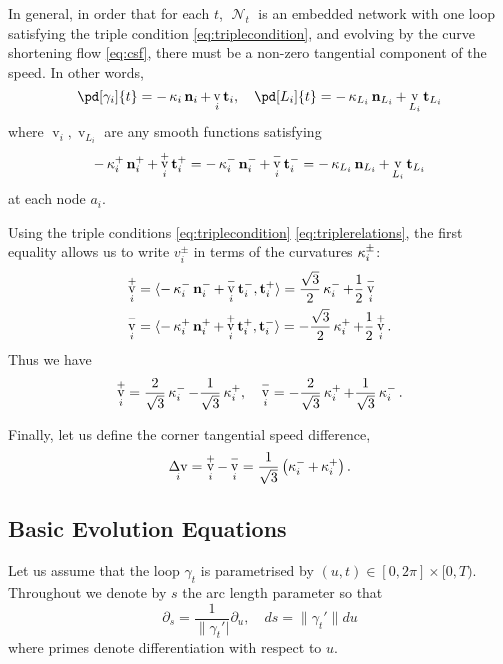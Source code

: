 \documentclass[11pt]{amsart}
\DeclareMathOperator{\tangspeed}{v}
\DeclareMathOperator{\network}{\mathcal{N}}
\DeclareMathOperator{\corneranglespeed}{{\Delta v}}
\begin{document}
In general, in order that for each \(t\), \(\network_t\) is an embedded network with one loop satisfying the triple condition \eqref{eq:triplecondition}, and evolving by the curve shortening flow \eqref{eq:csf}, there must be a non-zero tangential component of the speed. In other words,
\begin{equation}
\label{eq:csf_with_tang}
\pd[\gamma_i]{t} = -\curvecurv_i \nor_i + \tangspeed_i \tang_i, \quad \pd[L_i]{t} = -\curvecurv_{L_i} \nor_{L_i} + \tangspeed_{L_i} \tang_{L_i}
\end{equation}
where \(\tangspeed_i, \tangspeed_{L_i}\) are any smooth functions satisfying
\begin{equation}
\label{eq:speedcompatability}
-\curvecurv_i^+ \nor_i^+ + \tangspeed_i^+ \tang_i^+ = -\curvecurv_i^- \nor_i^- + \tangspeed_i^- \tang_i^- = -\curvecurv_{L_i} \nor_{L_i} + \tangspeed_{L_i} \tang_{L_i}
\end{equation}
at each node \(a_i\).

Using the triple conditions \eqref{eq:triplecondition} \eqref{eq:triplerelations}, the first equality allows us to write \(v_i^{\pm}\) in terms of the curvatures \(\operatorname{\kappa}_i^{\pm}\):
\begin{align*}
\tangspeed_i^+ &= \ip{-\curvecurv_i^- \nor_i^- + \tangspeed_i^- \tang_i^-}{\tang_i^+} = \frac{\sqrt{3}}{2} \curvecurv_i^- + \frac{1}{2} \tangspeed_i^- \\
\tangspeed_i^- &= \ip{-\curvecurv_i^+ \nor_i^+ + \tangspeed_i^+ \tang_i^+}{\tang_i^-} = - \frac{\sqrt{3}}{2} \curvecurv_i^+ + \frac{1}{2} \tangspeed_i^+.
\end{align*}
Thus we have
\begin{equation}
\label{eq:tangspeedcurvture}
\tangspeed_i^+ = \frac{2}{\sqrt{3}} \curvecurv_i^- - \frac{1}{\sqrt{3}} \curvecurv_i^+, \quad \tangspeed_i^- = -\frac{2}{\sqrt{3}} \curvecurv_i^+ + \frac{1}{\sqrt{3}} \curvecurv_i^-.
\end{equation}

Finally, let us define the corner tangential speed difference,
\[
\corneranglespeed_i = \tangspeed_i^+ - \tangspeed_i^- = \frac{1}{\sqrt{3}} \left(\curvecurv_i^- + \curvecurv_i^+\right).
\]

\subsection{Basic Evolution Equations}
\label{sec:orgheadline4}

Let us assume that the loop \(\gamma_t\) is parametrised by \((u, t) \in [0, 2\pi] \times [0, T)\). Throughout we denote by \(s\) the arc length parameter so that
\[
\partial_s = \frac{1}{\|\gamma_t'|} \partial_u, \quad ds = \|\gamma_t'\| du
\]
where primes denote differentiation with respect to \(u\).
\end{document}
